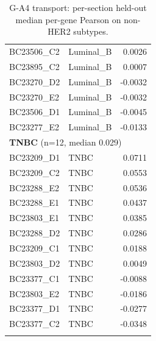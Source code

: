 \begin{longtable}{llr}
BC23506\_C2 & Luminal\_B & 0.0026\\
BC23895\_C2 & Luminal\_B & 0.0007\\
BC23270\_D2 & Luminal\_B & -0.0032\\
BC23270\_E2 & Luminal\_B & -0.0032\\
BC23506\_D1 & Luminal\_B & -0.0045\\
BC23277\_E2 & Luminal\_B & -0.0133\\
\multicolumn{3}{l}{\textbf{TNBC} (n=12, median 0.029)}\\\hline
BC23209\_D1 & TNBC & 0.0711\\
BC23209\_C2 & TNBC & 0.0553\\
BC23288\_E2 & TNBC & 0.0536\\
BC23288\_E1 & TNBC & 0.0437\\
BC23803\_E1 & TNBC & 0.0385\\
BC23288\_D2 & TNBC & 0.0286\\
BC23209\_C1 & TNBC & 0.0188\\
BC23803\_D2 & TNBC & 0.0049\\
BC23377\_C1 & TNBC & -0.0088\\
BC23803\_E2 & TNBC & -0.0186\\
BC23377\_D1 & TNBC & -0.0277\\
BC23377\_C2 & TNBC & -0.0348\\
\hline\hline\caption{G-A4 transport: per-section held-out median per-gene Pearson on non-HER2 subtypes.}\label{tab:transport}\end{longtable}
